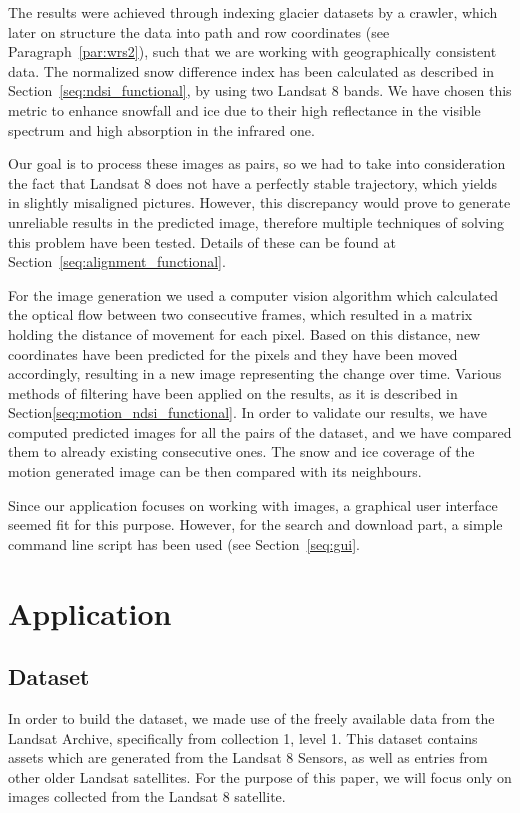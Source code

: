 \documentclass[12pt, a4paper]{report}
\begin{document}
	\par The results were achieved through indexing glacier datasets by a crawler, which later on structure the data into path and row coordinates (see Paragraph~\ref{par:wrs2}), such that we are working with geographically consistent data. The normalized snow difference index has been calculated as described in Section~\ref{seq:ndsi_functional}, by using two Landsat 8 bands. We have chosen this metric to enhance snowfall and ice due to their high reflectance in the visible spectrum and high absorption in the infrared one.
	
	\par Our goal is to process these images as pairs, so we had to take into consideration the fact that Landsat 8 does not have a perfectly stable trajectory, which yields in slightly misaligned pictures. However, this discrepancy would prove to generate unreliable results in the predicted image, therefore multiple techniques of solving this problem have been tested. Details of these can be found at Section~\ref{seq:alignment_functional}.

	\par For the image generation we used a computer vision algorithm which calculated the optical flow between two consecutive frames, which resulted in a matrix holding the distance of movement for each pixel. Based on this distance, new coordinates have been predicted for the pixels and they have been moved accordingly, resulting in a new image representing the change over time. Various methods of filtering have been applied on the results, as it is described in Section\ref{seq:motion_ndsi_functional}. In order to validate our results, we have computed predicted images for all the pairs of the dataset, and we have compared them to already existing consecutive ones. The snow and ice coverage of the motion generated image can be then compared with its neighbours.

	\par Since our application focuses on working with images, a graphical user interface seemed fit for this purpose. However, for the search and download part, a simple command line script has been used (see Section~\ref{seq:gui}.
	
	\newpage{}
	
	\chapter{Application}
	\section{Dataset}
	\par In order to build the dataset, we made use of the freely available data from the Landsat Archive, specifically from collection 1, level 1. This dataset contains assets which are generated from the Landsat 8 Sensors, as well as entries from other older Landsat satellites. For the purpose of this paper, we will focus only on images collected from the Landsat 8 satellite.
	
\end{document}
